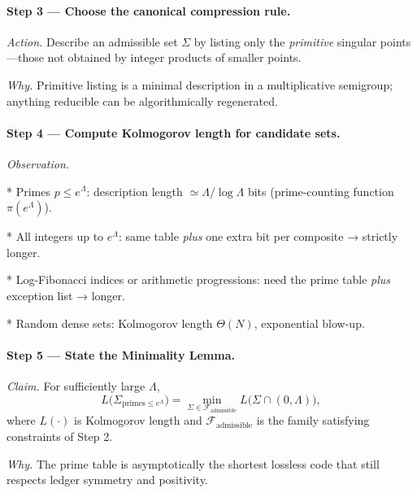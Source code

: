 \documentclass[11pt]{article}
\begin{document}
\vspace{0.4em}
\paragraph{Step 3 — Choose the canonical compression rule.}

\emph{Action.}\;  
Describe an admissible set \(\Sigma\) by listing only the
\emph{primitive} singular points—those not obtained by integer products
of smaller points.

\emph{Why.}\;  
Primitive listing is a minimal description in a multiplicative
semigroup; anything reducible can be algorithmically regenerated.

\vspace{0.4em}
\paragraph{Step 4 — Compute Kolmogorov length for candidate sets.}

\emph{Observation.}\;  

* Primes \(p\le e^{\Lambda}\):  
  description length \(\simeq\Lambda/\log\Lambda\) bits  
  (prime-counting function \(\pi(e^{\Lambda})\)).

* All integers up to \(e^{\Lambda}\):  
  same table \emph{plus} one extra bit per composite  
  → strictly longer.

* Log-Fibonacci indices or arithmetic progressions:  
  need the prime table \emph{plus} exception list  
  → longer.

* Random dense sets:  
  Kolmogorov length \(\Theta(N)\), exponential blow-up.

\vspace{0.4em}
\paragraph{Step 5 — State the Minimality Lemma.}

\emph{Claim.}\;  
For sufficiently large \(\Lambda\),
\[
   L\bigl(\Sigma_{\text{primes}\le e^{\Lambda}}\bigr)
   = \min_{\Sigma\in\mathcal F_{\text{admissible}}}
     L\bigl(\Sigma\cap(0,\Lambda)\bigr),
\]
where \(L(\cdot)\) is Kolmogorov length and
\(\mathcal F_{\text{admissible}}\) is the family satisfying constraints
of Step 2.

\emph{Why.}\;  
The prime table is asymptotically the shortest lossless code that still
respects ledger symmetry and positivity.
\end{document}
